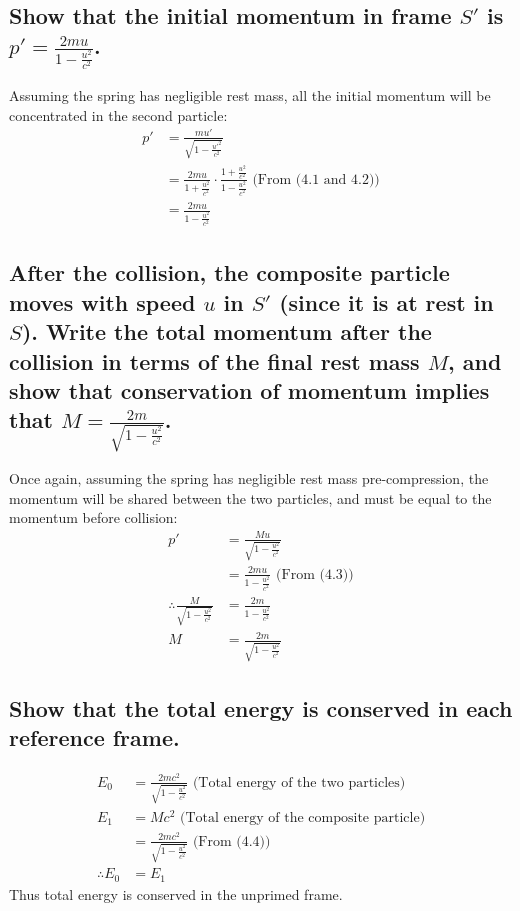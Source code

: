 \documentclass[a4paper]{scrartcl}
\begin{document}
\subsection{Show that the initial momentum in frame \(S'\) is \(p' = \frac{2 m u}{1 - \frac{u^2}{c^2}}\).}
Assuming the spring has negligible rest mass, all the initial momentum will be concentrated in the second particle:
\begin{align*}
    p' &= \frac{m u'}{\sqrt{1 - \frac{u'^2}{c^2}}} \\
    &= \frac{2 m u}{1 + \frac{u^2}{c^2}} \cdot \frac{1 + \frac{u^2}{c^2}}{1 - \frac{u^2}{c^2}} \text{ (From (4.1 and 4.2))} \\
    &= \frac{2 m u}{1 - \frac{u^2}{c^2}}
\end{align*}

\subsection{After the collision, the composite particle moves with speed \(u\) in \(S'\) (since it is at rest in \(S\)). Write the total momentum after the collision in terms of the final rest mass \(M\), and show that conservation of momentum implies that \(M = \frac{2 m}{\sqrt{1 - \frac{u^2}{c^2}}}\).}
Once again, assuming the spring has negligible rest mass pre-compression, the momentum will be shared between the two particles, and must be equal to the momentum before collision:
\begin{align*}
    p' &= \frac{M u}{\sqrt{1 - \frac{u^2}{c^2}}} \\
    &= \frac{2 m u}{1 - \frac{u^2}{c^2}} \text{ (From (4.3))} \\
    \therefore \frac{M}{\sqrt{1 - \frac{u^2}{c^2}}} &= \frac{2 m}{1 - \frac{u^2}{c^2}} \\
    M &= \frac{2 m}{\sqrt{1 - \frac{u^2}{c^2}}}
\end{align*}

\subsection{Show that the total energy is conserved in each reference frame.}
\begin{align*}
    E_0 &= \frac{2 m c^2}{\sqrt{1 - \frac{u^2}{c^2}}} \text{ (Total energy of the two particles)} \\
    E_1 &= M c^2 \text{ (Total energy of the composite particle)} \\
    &= \frac{2 m c^2}{\sqrt{1 - \frac{u^2}{c^2}}} \text{ (From (4.4))} \\
    \therefore E_0 &= E_1
\end{align*}
Thus total energy is conserved in the unprimed frame.
\end{document}
